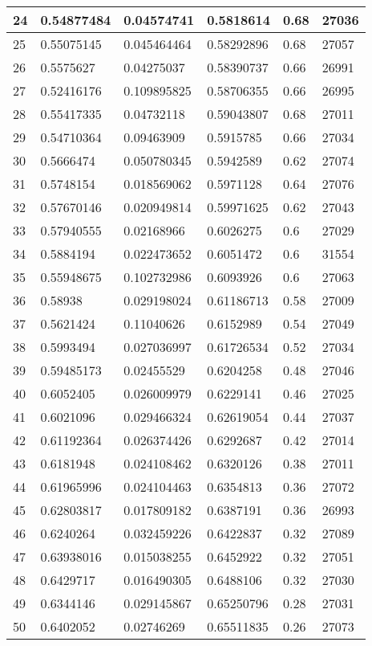 \begin{longtable}{|l|l|l|l|l|l|}
24 & 0.54877484 & 0.04574741 & 0.5818614 & 0.68 & 27036 \\ \hline 
25 & 0.55075145 & 0.045464464 & 0.58292896 & 0.68 & 27057 \\ \hline 
26 & 0.5575627 & 0.04275037 & 0.58390737 & 0.66 & 26991 \\ \hline 
27 & 0.52416176 & 0.109895825 & 0.58706355 & 0.66 & 26995 \\ \hline 
28 & 0.55417335 & 0.04732118 & 0.59043807 & 0.68 & 27011 \\ \hline 
29 & 0.54710364 & 0.09463909 & 0.5915785 & 0.66 & 27034 \\ \hline 
30 & 0.5666474 & 0.050780345 & 0.5942589 & 0.62 & 27074 \\ \hline 
31 & 0.5748154 & 0.018569062 & 0.5971128 & 0.64 & 27076 \\ \hline 
32 & 0.57670146 & 0.020949814 & 0.59971625 & 0.62 & 27043 \\ \hline 
33 & 0.57940555 & 0.02168966 & 0.6026275 & 0.6 & 27029 \\ \hline 
34 & 0.5884194 & 0.022473652 & 0.6051472 & 0.6 & 31554 \\ \hline 
35 & 0.55948675 & 0.102732986 & 0.6093926 & 0.6 & 27063 \\ \hline 
36 & 0.58938 & 0.029198024 & 0.61186713 & 0.58 & 27009 \\ \hline 
37 & 0.5621424 & 0.11040626 & 0.6152989 & 0.54 & 27049 \\ \hline 
38 & 0.5993494 & 0.027036997 & 0.61726534 & 0.52 & 27034 \\ \hline 
39 & 0.59485173 & 0.02455529 & 0.6204258 & 0.48 & 27046 \\ \hline 
40 & 0.6052405 & 0.026009979 & 0.6229141 & 0.46 & 27025 \\ \hline 
41 & 0.6021096 & 0.029466324 & 0.62619054 & 0.44 & 27037 \\ \hline 
42 & 0.61192364 & 0.026374426 & 0.6292687 & 0.42 & 27014 \\ \hline 
43 & 0.6181948 & 0.024108462 & 0.6320126 & 0.38 & 27011 \\ \hline 
44 & 0.61965996 & 0.024104463 & 0.6354813 & 0.36 & 27072 \\ \hline 
45 & 0.62803817 & 0.017809182 & 0.6387191 & 0.36 & 26993 \\ \hline 
46 & 0.6240264 & 0.032459226 & 0.6422837 & 0.32 & 27089 \\ \hline 
47 & 0.63938016 & 0.015038255 & 0.6452922 & 0.32 & 27051 \\ \hline 
48 & 0.6429717 & 0.016490305 & 0.6488106 & 0.32 & 27030 \\ \hline 
49 & 0.6344146 & 0.029145867 & 0.65250796 & 0.28 & 27031 \\ \hline 
50 & 0.6402052 & 0.02746269 & 0.65511835 & 0.26 & 27073 \\ \hline 
\end{longtable}